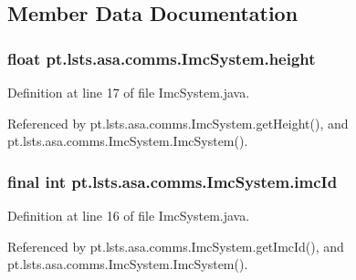 \subsection{Member Data Documentation}
\hypertarget{classpt_1_1lsts_1_1asa_1_1comms_1_1ImcSystem_afcbb198ac569fb1ae5de4a1809bed10c}{}
\subsubsection[{height}]{\setlength{\rightskip}{0pt plus 5cm}float pt.\+lsts.\+asa.\+comms.\+Imc\+System.\+height\hspace{0.3cm}{\ttfamily [private]}}\label{classpt_1_1lsts_1_1asa_1_1comms_1_1ImcSystem_afcbb198ac569fb1ae5de4a1809bed10c}


Definition at line 17 of file Imc\+System.\+java.



Referenced by pt.\+lsts.\+asa.\+comms.\+Imc\+System.\+get\+Height(), and pt.\+lsts.\+asa.\+comms.\+Imc\+System.\+Imc\+System().

\hypertarget{classpt_1_1lsts_1_1asa_1_1comms_1_1ImcSystem_ac42b6810c36514facda51cc0cf42d343}{}
\subsubsection[{imc\+Id}]{\setlength{\rightskip}{0pt plus 5cm}final int pt.\+lsts.\+asa.\+comms.\+Imc\+System.\+imc\+Id\hspace{0.3cm}{\ttfamily [private]}}\label{classpt_1_1lsts_1_1asa_1_1comms_1_1ImcSystem_ac42b6810c36514facda51cc0cf42d343}


Definition at line 16 of file Imc\+System.\+java.



Referenced by pt.\+lsts.\+asa.\+comms.\+Imc\+System.\+get\+Imc\+Id(), and pt.\+lsts.\+asa.\+comms.\+Imc\+System.\+Imc\+System().

\hypertarget{classpt_1_1lsts_1_1asa_1_1comms_1_1ImcSystem_a035749ded821f7a8095f7174b74c904e}{}
